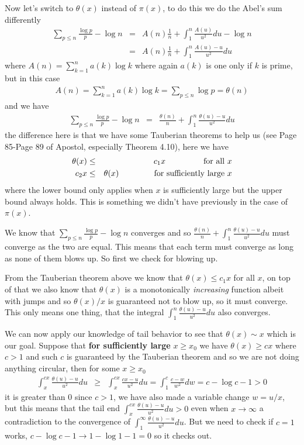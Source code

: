 \documentclass[aps,preprint,preprintnumbers,nofootinbib,showpacs,prd]{revtex4-1}
\newcommand{\nbea}{\begin{eqnarray*}}
\newcommand{\neea}{\end{eqnarray*}}
\begin{document}
Now let's switch to $\theta(x)$ instead of $\pi(x)$, to do this we do the Abel's sum differently
%
\nbea
\sum_{p\le n} \frac{\log p}{p} - \log n & = & A(n)\frac{1}{n} + \int_1^n \frac{A(u)}{u^2} du - \log n \\
& = & A(n)\frac{1}{n} + \int_1^n \frac{A(u) - u}{u^2} du
\neea
%
where $A(n) = \sum_{k=1}^n a(k) \log k$ where again $a(k)$ is one only if $k$ is prime, but in this case
%
\nbea
A(n) = \sum_{k=1}^n a(k) \log k = \sum_{p \le n} \log p = \theta(n)
\neea
%
and we have
%
\nbea
\sum_{p\le n} \frac{\log p}{p} - \log n & = & \frac{\theta(n)}{n} + \int_1^n \frac{\theta(u) - u}{u^2} du
\neea
%
the difference here is that we have some Tauberian theorems to help us (see Page 85-Page 89 of Apostol, especially Theorem 4.10), here we have
%
\nbea
\theta(x) & \le & c_1x {\rm~~~~~~~~~~~~~~for~all~}x \\
c_2x & \le & \theta(x) {\rm~~~~~~~~~~~~~for~sufficiently~large~}x
\neea
%
where the lower bound only applies when $x$ is sufficiently large but the upper bound always holds. This is something we didn't have previously in the case of $\pi(x)$.

We know that $\sum_{p\le n}\frac{\log p}{p} - \log n$ converges and so $\frac{\theta(n)}{n} + \int_1^n \frac{\theta(u) - u}{u^2} du$ must converge as the two are equal. This means that each term must converge as long as none of them blows up. So first we check for blowing up.

From the Tauberian theorem above we know that $\theta(x) \le c_1x$ for all $x$, on top of that we also know that $\theta(x)$ is a monotonically {\it increasing} function albeit with jumps and so $\theta(x)/x$ is guaranteed not to blow up, so it must converge. This only means one thing, that the integral $\int_1^n \frac{\theta(u) - u}{u^2} du$ also converges.

We can now apply our knowledge of tail behavior to see that $\theta(x) \sim x$ which is our goal. Suppose that {\bf for sufficiently large} $x \ge x_0$ we have $\theta(x) \ge cx$ where $c > 1$ and such $c$ is guaranteed by the Tauberian theorem and so we are not doing anything circular, then for some $x \ge x_0$
%
\nbea
\int_x^{cx} \frac{\theta(u) - u}{u^2}du & \ge & \int_x^{cx} \frac{cx - u}{u^2}du = \int_1^{c} \frac{c - w}{w^2}dw = c - \log c - 1 > 0
\neea
%
it is greater than 0 since $c>1$, we have also made a variable change $w = u/x$, but this means that the tail end $\int_x^{cx} \frac{\theta(u) - u}{u^2}du > 0$ even when $x\to\infty$ a contradiction to the convergence of $\int_1^{\infty} \frac{\theta(u) - u}{u^2}du$. But we need to check if $c=1$ works, $c - \log c - 1 \to 1 - \log 1 - 1 = 0$ so it checks out.
\end{document}
